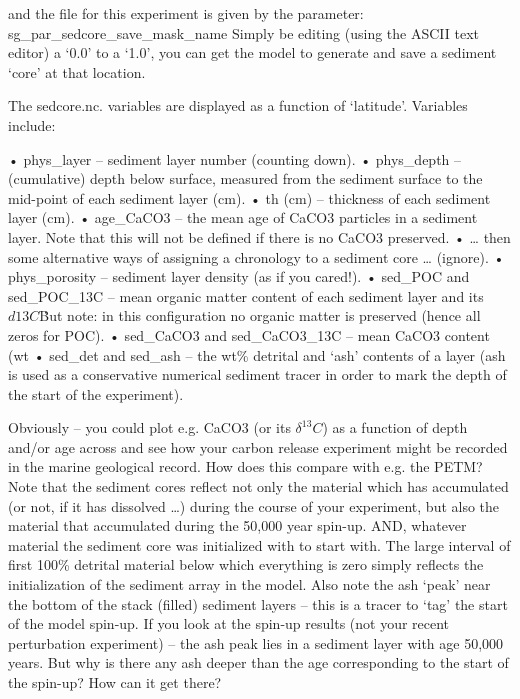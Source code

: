\documentclass[11pt,fleqn]{book} %
\begin{document}
and the file for this experiment is given by the parameter: sg\_par\_sedcore\_save\_mask\_name
Simply be editing (using the ASCII text editor) a ‘0.0’ to a ‘1.0’, you can get the model to generate and save a sediment ‘core’ at that location.

The sedcore.nc. variables are displayed as a function of ‘latitude’. Variables include:

•       phys\_layer – sediment layer number (counting down).
•       phys\_depth – (cumulative) depth below surface, measured from the sediment surface to the mid-point of each sediment layer (cm).
•       th (cm) – thickness of each sediment layer (cm).
•       age\_CaCO3 – the mean age of CaCO3 particles in a sediment layer. Note that this will not be defined if there is no CaCO3 preserved.
•       … then some alternative ways of assigning a chronology to a sediment core … (ignore).
•       phys\_porosity – sediment layer density (as if you cared!).
•       sed\_POC and sed\_POC\_13C – mean organic matter content of each sediment layer and its \(d13C\)\. But note: in this configuration no organic matter is preserved (hence all zeros for POC).
•       sed\_CaCO3 and sed\_CaCO3\_13C – mean CaCO3 content (wt%
•       sed\_det and sed\_ash – the wt\% detrital and ‘ash’ contents of a layer (ash is used as a conservative numerical sediment tracer in order to mark the depth of the start of the experiment).

Obviously – you could plot e.g. CaCO3 (or its \(\delta^{13}C\)) as a function of depth and/or age across and see how your carbon release experiment might be recorded in the marine geological record. How does this compare with e.g. the PETM?
Note that the sediment cores reflect not only the material which has accumulated (or not, if it has dissolved …) during the course of your experiment, but also the material that accumulated during the 50,000 year spin-up. AND, whatever material the sediment core was initialized with to start with. The large interval of first 100\% detrital material below which everything is zero simply reflects the initialization of the sediment array in the model. Also note the ash ‘peak’ near the bottom of the stack (filled) sediment layers – this is a tracer to ‘tag’ the start of the model spin-up. If you look at the spin-up results (not your recent perturbation experiment) – the ash peak lies in a sediment layer with age 50,000 years. But why is there any ash deeper than the age corresponding to the start of the spin-up? How can it get there?
\end{document}
